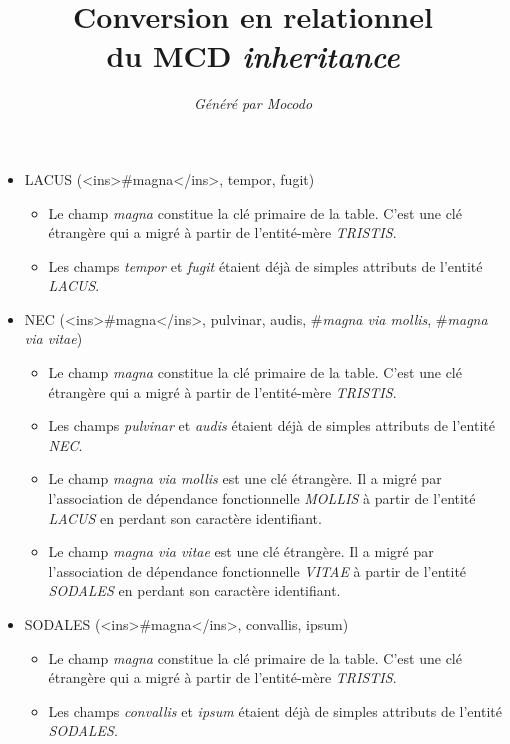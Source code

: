 \documentclass[a4paper]{article}
\title{Conversion en relationnel\\du MCD \emph{inheritance}}
\author{\emph{Généré par Mocodo}}
\newcommand{\relat}[1]{\textsc{#1}}
\newcommand{\attr}[1]{#1}
\newcommand{\foreign}[1]{\#\textsl{#1}}
\begin{document}
\maketitle

\begin{itemize}
  \item \relat{LACUS} (<ins>#magna</ins>, \attr{tempor}, \attr{fugit})
  \begin{itemize}
    \item Le champ \emph{magna} constitue la clé primaire de la table. C'est une clé étrangère qui a migré à partir de l'entité-mère \emph{TRISTIS}.
    \item Les champs \emph{tempor} et \emph{fugit} étaient déjà de simples attributs de l'entité \emph{LACUS}.
  \end{itemize}

  \item \relat{NEC} (<ins>#magna</ins>, \attr{pulvinar}, \attr{audis}, \foreign{magna via mollis}, \foreign{magna via vitae})
  \begin{itemize}
    \item Le champ \emph{magna} constitue la clé primaire de la table. C'est une clé étrangère qui a migré à partir de l'entité-mère \emph{TRISTIS}.
    \item Les champs \emph{pulvinar} et \emph{audis} étaient déjà de simples attributs de l'entité \emph{NEC}.
    \item Le champ \emph{magna via mollis} est une clé étrangère. Il a migré par l'association de dépendance fonctionnelle \emph{MOLLIS} à partir de l'entité \emph{LACUS} en perdant son caractère identifiant.
    \item Le champ \emph{magna via vitae} est une clé étrangère. Il a migré par l'association de dépendance fonctionnelle \emph{VITAE} à partir de l'entité \emph{SODALES} en perdant son caractère identifiant.
  \end{itemize}

  \item \relat{SODALES} (<ins>#magna</ins>, \attr{convallis}, \attr{ipsum})
  \begin{itemize}
    \item Le champ \emph{magna} constitue la clé primaire de la table. C'est une clé étrangère qui a migré à partir de l'entité-mère \emph{TRISTIS}.
    \item Les champs \emph{convallis} et \emph{ipsum} étaient déjà de simples attributs de l'entité \emph{SODALES}.
  \end{itemize}


\end{itemize}
\end{document}
